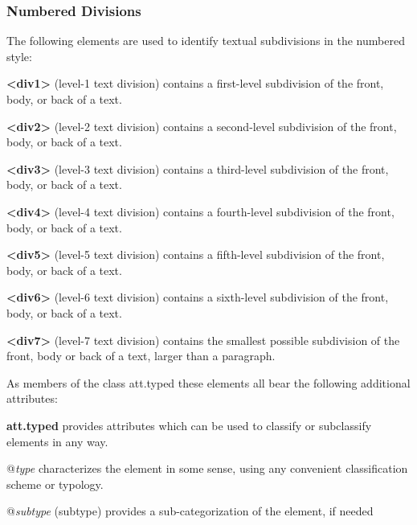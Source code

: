 \subsubsection[{Numbered Divisions}]{Numbered Divisions}\label{DSDIV2}\par
The following elements are used to identify textual subdivisions in the numbered style: 
\begin{sansreflist}
  
\item [\textbf{<div1>}] (level-1 text division) contains a first-level subdivision of the front, body, or back of a text.
\item [\textbf{<div2>}] (level-2 text division) contains a second-level subdivision of the front, body, or back of a text.
\item [\textbf{<div3>}] (level-3 text division) contains a third-level subdivision of the front, body, or back of a text.
\item [\textbf{<div4>}] (level-4 text division) contains a fourth-level subdivision of the front, body, or back of a text.
\item [\textbf{<div5>}] (level-5 text division) contains a fifth-level subdivision of the front, body, or back of a text.
\item [\textbf{<div6>}] (level-6 text division) contains a sixth-level subdivision of the front, body, or back of a text.
\item [\textbf{<div7>}] (level-7 text division) contains the smallest possible subdivision of the front, body or back of a text, larger than a paragraph.
\end{sansreflist}
 As members of the class \textsf{att.typed} these elements all bear the following additional attributes: 
\begin{sansreflist}
  
\item [\textbf{att.typed}] provides attributes which can be used to classify or subclassify elements in any way.\hfil\\[-10pt]\begin{sansreflist}
    \item[@{\itshape type}]
  characterizes the element in some sense, using any convenient classification scheme or typology.
    \item[@{\itshape subtype}]
  (subtype) provides a sub-categorization of the element, if needed
\end{sansreflist}  
\end{sansreflist}
\par
